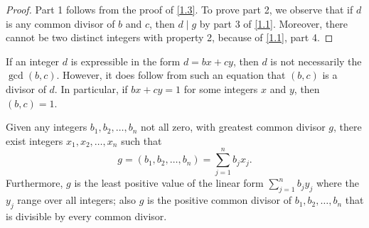 \documentclass[11pt]{article}
\begin{document}
\begin{proof}
	Part 1 follows from the proof of \cref{1.3}. To prove part 2, we observe that if \(d\) is any common divisor of \(b\) and \(c\), then \(d \mid g\) by part 3 of \cref{1.1}. Moreover, there cannot be two distinct integers with property 2, because of \cref{1.1}, part 4.
\end{proof}

\begin{remark}
	If an integer \(d\) is expressible in the form \(d = bx + cy\), then \(d\) is not
	necessarily the \(\gcd(b, c)\). However, it does follow from such an equation
	that \((b, c)\) is a divisor of \(d\). In particular, if \(bx + cy = 1\) for some integers
	\(x\) and \(y\), then \((b, c) = 1\).
\end{remark}

\begin{theorem}\label{1.5}
	Given any integers $b_1, b_2, \ldots, b_n$ not all zero, with greatest common divisor $g$, there exist integers $x_1, x_2, \ldots, x_n$ such that
	\[
		g = (b_1, b_2, \ldots, b_n) = \sum_{j=1}^{n} b_j x_j.
	\]
	Furthermore, $g$ is the least positive value of the linear form $\sum_{j=1}^{n}
		b_j y_j$ where the $y_j$ range over all integers; also $g$ is the positive
	common divisor of $b_1, b_2, \ldots, b_n$ that is divisible by every common
	divisor.
\end{theorem}
\end{document}
